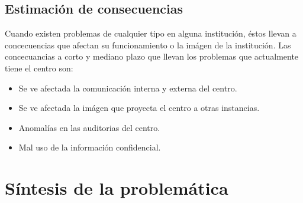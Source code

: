	\subsection{Estimación de consecuencias}
	Cuando existen problemas de cualquier tipo en alguna institución, éstos llevan a concecuencias que afectan su funcionamiento o la imágen de la institución. Las concecuancias a corto y mediano plazo que llevan los problemas que actualmente tiene el centro son:

\begin{itemize}
	\item Se ve afectada la comunicación interna y externa del centro.
	\item Se ve afectada la imágen que proyecta el centro a otras instancias.
	\item Anomalías en las auditorias del centro.
	\item Mal uso de la información confidencial.
\end{itemize}
\section{Síntesis de la problemática}




